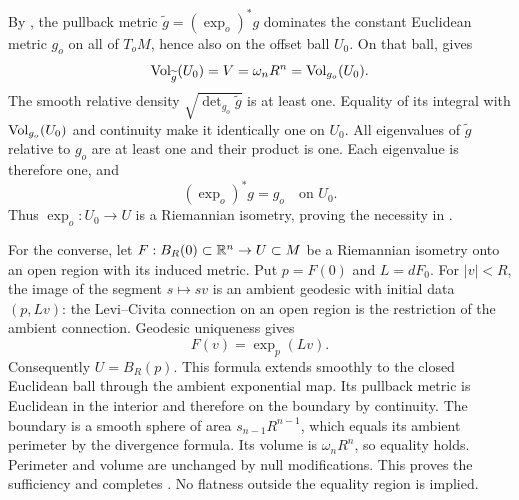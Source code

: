 By , the pullback metric
$\widetilde g=(\exp_o)^*g$ dominates the constant Euclidean metric
$g_o$ on all of $T_oM$, hence also on the offset ball $U_0$.
On that ball,  gives
\[
 \operatorname{Vol}_{\widetilde g}(U_0)=V=\omega_nR^n=\operatorname{Vol}_{g_o}(U_0).
\]
The smooth relative density $\sqrt{\det_{g_o}\widetilde g}$ is at least
one. Equality of its integral with $\operatorname{Vol}_{g_o}(U_0)$ and continuity
make it identically one on $U_0$. All eigenvalues of $\widetilde g$
relative to $g_o$ are at least one and their product is one.
Each eigenvalue is therefore one, and
\[
 (\exp_o)^*g=g_o\quad\text{on }U_0.
\]
Thus $\exp_o:U_0\to U$ is a Riemannian isometry, proving the necessity
in .

For the converse, let $F:B_R(0)\subset\mathbb R^n\to U\subset M$ be a
Riemannian isometry onto an open region with its induced metric.
Put $p=F(0)$ and $L=dF_0$. For $|v|<R$, the image of the segment
$s\mapsto sv$ is an ambient geodesic with initial data $(p,Lv)$:
the Levi--Civita connection on an open region is the restriction of
the ambient connection. Geodesic uniqueness gives
\[
 F(v)=\exp_p(Lv).
\]
Consequently $U=B_R(p)$. This formula extends smoothly to the closed
Euclidean ball through the ambient exponential map. Its pullback metric
is Euclidean in the interior and therefore on the boundary by continuity.
The boundary is a smooth sphere of area $s_{n-1}R^{n-1}$, which equals
its ambient perimeter by the divergence formula. Its volume is
$\omega_nR^n$, so equality holds. Perimeter and volume are unchanged
by null modifications. This proves the sufficiency and completes
. No flatness outside the equality region is implied.
